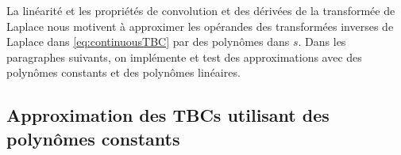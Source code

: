 %
%

\indent La linéarité et les propriétés de convolution et des dérivées de la transformée de Laplace  \cite{laplaceTransform} nous motivent à approximer les opérandes des transformées inverses de Laplace dans \eqref{eq:continuousTBC} par des polynômes dans $s$. Dans les paragraphes suivants, on implémente et test des approximations avec des polynômes constants et des polynômes linéaires.

\subsection{Approximation des TBCs utilisant des polynômes constants}

